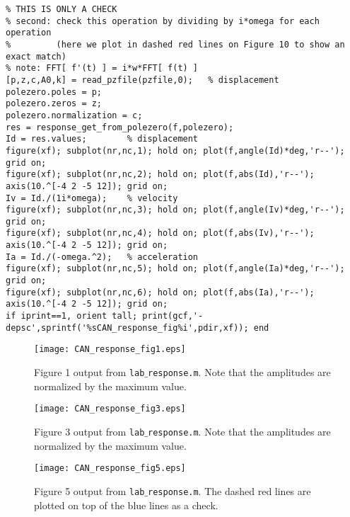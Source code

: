 \documentclass[11pt,titlepage,fleqn]{article}
\newcommand{\tfile}{{\tt lab$\_$response.m}}
\begin{document}
\begin{spacing}{1.0}
\begin{verbatim}
% THIS IS ONLY A CHECK
% second: check this operation by dividing by i*omega for each operation
%         (here we plot in dashed red lines on Figure 10 to show an exact match)
% note: FFT[ f'(t) ] = i*w*FFT[ f(t) ]
[p,z,c,A0,k] = read_pzfile(pzfile,0);   % displacement
polezero.poles = p;
polezero.zeros = z;
polezero.normalization = c;
res = response_get_from_polezero(f,polezero);
Id = res.values;        % displacement
figure(xf); subplot(nr,nc,1); hold on; plot(f,angle(Id)*deg,'r--'); grid on;
figure(xf); subplot(nr,nc,2); hold on; plot(f,abs(Id),'r--'); axis(10.^[-4 2 -5 12]); grid on;
Iv = Id./(1i*omega);    % velocity
figure(xf); subplot(nr,nc,3); hold on; plot(f,angle(Iv)*deg,'r--'); grid on;
figure(xf); subplot(nr,nc,4); hold on; plot(f,abs(Iv),'r--'); axis(10.^[-4 2 -5 12]); grid on;
Ia = Id./(-omega.^2);   % acceleration
figure(xf); subplot(nr,nc,5); hold on; plot(f,angle(Ia)*deg,'r--'); grid on;
figure(xf); subplot(nr,nc,6); hold on; plot(f,abs(Ia),'r--'); axis(10.^[-4 2 -5 12]); grid on;
if iprint==1, orient tall; print(gcf,'-depsc',sprintf('%sCAN_response_fig%i',pdir,xf)); end
\end{verbatim}
\end{spacing}



%

\begin{figure}
\centering
\texttt{[image: CAN\_response\_fig1.eps]}
\caption[]
{{
Figure 1 output from \tfile.
Note that the amplitudes are normalized by the maximum value.
}}
\label{fig1}
\end{figure}

\iffalse
\begin{figure}
\centering
\texttt{[image: CAN\_response\_fig2.eps]}
\caption[]
{{
Figure 2 output from \tfile.
Note that the amplitudes are normalized by the maximum value.
}}
\label{fig2}
\end{figure}
\fi

\begin{figure}
\centering
\texttt{[image: CAN\_response\_fig3.eps]}
\caption[]
{{
Figure 3 output from \tfile.
Note that the amplitudes are normalized by the maximum value.
}}
\label{fig3}
\end{figure}

\iffalse
\begin{figure}
\centering
\texttt{[image: CAN\_response\_fig4.eps]}
\caption[]
{{
Figure 4 output from \tfile.
Note that the amplitudes are normalized by the maximum value.
}}
\label{fig4}
\end{figure}
\fi

\begin{figure}
\centering
\texttt{[image: CAN\_response\_fig5.eps]}
\caption[]
{{
Figure 5 output from \tfile.
The dashed red lines are plotted on top of the blue lines as a check.
}}
\label{fig5}
\end{figure}

\end{document}
